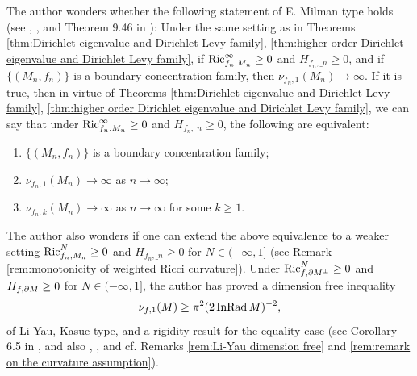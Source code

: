 \begin{rem}\label{rem:conjecture}
The author wonders whether the following statement of E. Milman type holds (see \cite{Mi1}, \cite{Mi2}, and Theorem 9.46 in \cite{Sh}):
Under the same setting as in Theorems \ref{thm:Dirichlet eigenvalue and Dirichlet Levy family}, \ref{thm:higher order Dirichlet eigenvalue and Dirichlet Levy family},
if $\operatorname{Ric}^{\infty}_{f_{n},M_{n}}\geq 0$ and $H_{f_{n},\bm_{n}}\geq 0$,
and if $\{(M_{n},f_{n})\}$ is a boundary concentration family,
then $\nu_{f_{n},1}(M_{n})\to \infty$.
If it is true,
then
in virtue of Theorems \ref{thm:Dirichlet eigenvalue and Dirichlet Levy family}, \ref{thm:higher order Dirichlet eigenvalue and Dirichlet Levy family},
we can say that
under $\operatorname{Ric}^{\infty}_{f_{n},M_{n}}\geq 0$ and $H_{f_{n},\bm_{n}}\geq 0$,
the following are equivalent:
\begin{enumerate}\setlength{\itemsep}{+0.7mm}
\item $\{(M_{n},f_{n})\}$ is a boundary concentration family;
\item $\nu_{f_{n},1}(M_{n})\to \infty$ as $n\to \infty$;
\item $\nu_{f_{n},k}(M_{n})\to \infty$ as $n\to \infty$ for some $k\geq 1$.
\end{enumerate}

The author also wonders if
one can extend the above equivalence to a weaker setting $\operatorname{Ric}^{N}_{f_{n},M_{n}}\geq 0$ and $H_{f_{n},\bm_{n}}\geq 0$ for $N\in (-\infty,1]$ (see Remark \ref{rem:monotonicity of weighted Ricci curvature}).
Under $\operatorname{Ric}^{N}_{f,\partial M^{\perp}}\geq 0$ and $H_{f,\partial M}\geq 0$ for $N\in (-\infty,1]$,
the author \cite{S1.5} has proved a dimension free inequality
\begin{equation*}
\nu_{f,1}(M)\geq \pi^{2} (2\operatorname{InRad} M)^{-2},
\end{equation*}
of Li-Yau, Kasue type,
and a rigidity result for the equality case (see Corollary 6.5 in \cite{S1.5}, and also \cite{LY}, \cite{K2}, and cf. Remarks \ref{rem:Li-Yau dimension free} and \ref{rem:remark on the curvature assumption}).
\end{rem}

